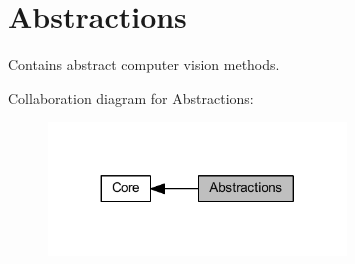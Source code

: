 \hypertarget{group___abstractions}{}\section{Abstractions}
\label{group___abstractions}


Contains abstract computer vision methods.  


Collaboration diagram for Abstractions\+:
\nopagebreak
\begin{figure}[H]
\begin{center}
\leavevmode
\includegraphics[width=224pt]{group___abstractions}
\end{center}
\end{figure}
